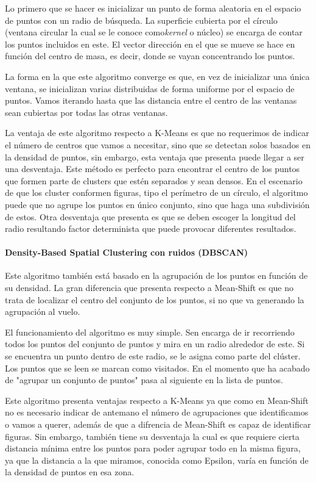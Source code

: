 \documentclass[conference,a4paper]{IEEEtran}
\begin{document}
Lo primero que se hacer es inicializar un punto de forma aleatoria en el espacio de puntos con un radio de búsqueda. La superficie cubierta por el círculo (ventana circular la cual se le conoce como\textit{kernel} o núcleo) se encarga de contar los puntos incluidos en este. El vector dirección en el que se mueve se hace en función del centro de masa, es decir, donde se vayan concentrando los puntos.

La forma en la que este algoritmo converge es que, en vez de inicializar una única ventana, se inicializan varias distribuidas de forma uniforme por el espacio de puntos. Vamos iterando hasta que las distancia entre el centro de las ventanas sean cubiertas por todas las otras ventanas.

La ventaja de este algoritmo respecto a K-Means es que no requerimos de indicar el número de centros que vamos a necesitar, sino que se detectan solos basados en la densidad de puntos, sin embargo, esta ventaja que presenta puede llegar a ser una desventaja. Este método es perfecto para encontrar el centro de los puntos que formen parte de clusters que estén separados y sean densos. En el escenario de que los cluster conformen figuras, tipo el perímetro de un círculo, el algoritmo puede que no agrupe los puntos en único conjunto, sino que haga una subdivisión de estos. Otra desventaja que presenta es que se deben escoger la longitud del radio resultando factor determinista que puede provocar diferentes resultados.\\

\paragraph{\textbf{Density-Based Spatial Clustering con ruidos (DBSCAN)}}

Este algoritmo también está basado en la agrupación de los puntos en función de su densidad. La gran diferencia que presenta respecto a Mean-Shift es que no trata de localizar el centro del conjunto de los puntos, si no que va generando la agrupación al vuelo.

El funcionamiento del algoritmo es muy simple. Sen encarga de ir recorriendo todos los puntos del conjunto de puntos y mira en un radio alrededor de este. Si se encuentra un punto dentro de este radio, se le asigna como parte del clúster. Los puntos que se leen se marcan como visitados. En el momento que ha acabado de "agrupar un conjunto de puntos" pasa al siguiente en la lista de puntos.

Este algoritmo presenta ventajas respecto a K-Means ya que como en Mean-Shift no es necesario indicar de antemano el número de agrupaciones que identificamos o vamos a querer, además de que a difrencia de Mean-Shift es capaz de identificar figuras. Sin embargo, también tiene su desventaja la cual es que requiere cierta distancia mínima entre los puntos para poder agrupar todo en la misma figura, ya que la distancia a la que miramos, conocida como Epsilon, varía en función de la densidad de puntos en esa zona.\\
\end{document}
